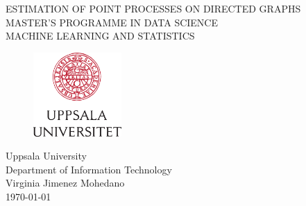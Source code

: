 
\thispagestyle{empty}

\vspace*{+5em}
\begin{center}
\LARGE ESTIMATION OF POINT PROCESSES ON DIRECTED GRAPHS\\
\vspace*{+5em}
\large MASTER'S PROGRAMME IN DATA SCIENCE\\
\large MACHINE LEARNING AND STATISTICS\\
\vspace*{+3em}
\begin{figure}[H]
\centering
\includegraphics[width=0.3\textwidth]{Images/logo_uu_se.png}
\end{figure}

\vspace*{+3em}
Uppsala University\\
Department of Information Technology\\
\vspace*{+2em}
Virginia Jimenez Mohedano\\

\vspace*{+8em}
\today

\end{center}